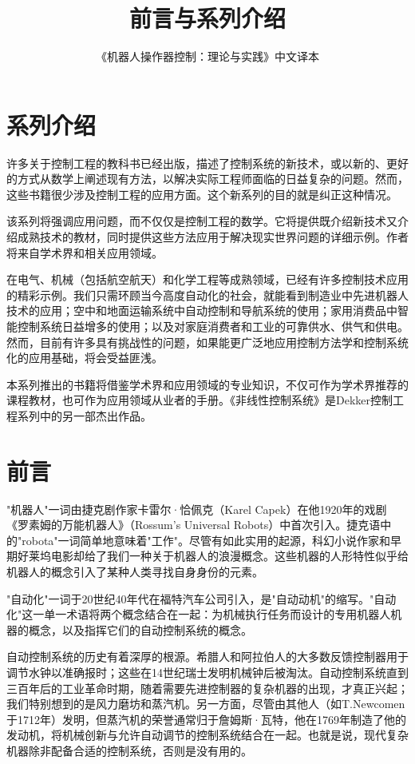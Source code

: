 \documentclass[UTF8,a4paper]{ctexart}
\title{前言与系列介绍}
\author{《机器人操作器控制：理论与实践》中文译本}
\date{}
\begin{document}
\maketitle

\section{系列介绍}

许多关于控制工程的教科书已经出版，描述了控制系统的新技术，或以新的、更好的方式从数学上阐述现有方法，以解决实际工程师面临的日益复杂的问题。然而，这些书籍很少涉及控制工程的应用方面。这个新系列的目的就是纠正这种情况。

该系列将强调应用问题，而不仅仅是控制工程的数学。它将提供既介绍新技术又介绍成熟技术的教材，同时提供这些方法应用于解决现实世界问题的详细示例。作者将来自学术界和相关应用领域。

在电气、机械（包括航空航天）和化学工程等成熟领域，已经有许多控制技术应用的精彩示例。我们只需环顾当今高度自动化的社会，就能看到制造业中先进机器人技术的应用；空中和地面运输系统中自动控制和导航系统的使用；家用消费品中智能控制系统日益增多的使用；以及对家庭消费者和工业的可靠供水、供气和供电。然而，目前有许多具有挑战性的问题，如果能更广泛地应用控制方法学和控制系统化的应用基础，将会受益匪浅。

本系列推出的书籍将借鉴学术界和应用领域的专业知识，不仅可作为学术界推荐的课程教材，也可作为应用领域从业者的手册。《非线性控制系统》是Dekker控制工程系列中的另一部杰出作品。

\section{前言}

"机器人"一词由捷克剧作家卡雷尔·恰佩克（Karel Capek）在他1920年的戏剧《罗素姆的万能机器人》（Rossum's Universal Robots）中首次引入。捷克语中的"robota"一词简单地意味着"工作"。尽管有如此实用的起源，科幻小说作家和早期好莱坞电影却给了我们一种关于机器人的浪漫概念。这些机器的人形特性似乎给机器人的概念引入了某种人类寻找自身身份的元素。

"自动化"一词于20世纪40年代在福特汽车公司引入，是"自动动机"的缩写。"自动化"这一单一术语将两个概念结合在一起：为机械执行任务而设计的专用机器人机器的概念，以及指挥它们的自动控制系统的概念。

自动控制系统的历史有着深厚的根源。希腊人和阿拉伯人的大多数反馈控制器用于调节水钟以准确报时；这些在14世纪瑞士发明机械钟后被淘汰。自动控制系统直到三百年后的工业革命时期，随着需要先进控制器的复杂机器的出现，才真正兴起；我们特别想到的是风力磨坊和蒸汽机。另一方面，尽管由其他人（如T.Newcomen于1712年）发明，但蒸汽机的荣誉通常归于詹姆斯·瓦特，他在1769年制造了他的发动机，将机械创新与允许自动调节的控制系统结合在一起。也就是说，现代复杂机器除非配备合适的控制系统，否则是没有用的。
\end{document}

